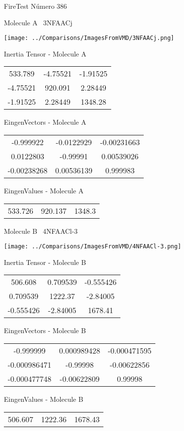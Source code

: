 \vtab[-3cm]
\begin{center}
{\large FireTest \tab Número 386}
\end{center}
\begin{multicols}{2}
\begin{center}

Molecule A \
3NFAACj

\texttt{[image: ../Comparisons/ImagesFromVMD/3NFAACj.png]}

Inertia Tensor - Molecule A \\
\begin{tabular}{|c c c|}
533.789	 & 	-4.75521	 & 	-1.91525	 \\
-4.75521	 & 	920.091	 & 	2.28449	 \\
-1.91525	 & 	2.28449	 & 	1348.28
\end{tabular}

\vtab
 EingenVectors - Molecule A     \\
\begin{tabular}{|c c c|}
-0.999922	 & 	-0.0122929	 & 	-0.00231663	 \\
0.0122803	 & 	-0.99991	 & 	0.00539026	 \\
-0.00238268	 & 	0.00536139	 & 	0.999983
\end{tabular}

\vtab
 EingenValues - Molecule A     \\
\begin{tabular}{|c c c|}
533.726	 & 	920.137	 & 	1348.3	 \\
\end{tabular}
\columnbreak

Molecule B \
4NFAACl-3

\texttt{[image: ../Comparisons/ImagesFromVMD/4NFAACl-3.png]}

Inertia Tensor - Molecule B \\
\begin{tabular}{|c c c|}
506.608	 & 	0.709539	 & 	-0.555426	 \\
0.709539	 & 	1222.37	 & 	-2.84005	 \\
-0.555426	 & 	-2.84005	 & 	1678.41
\end{tabular}

\vtab
 EingenVectors - Molecule B     \\
\begin{tabular}{|c c c|}
-0.999999	 & 	0.000989428	 & 	-0.000471595	 \\
-0.000986471	 & 	-0.99998	 & 	-0.00622856	 \\
-0.000477748	 & 	-0.00622809	 & 	0.99998
\end{tabular}

\vtab
 EingenValues - Molecule B     \\
\begin{tabular}{|c c c|}
506.607	 & 	1222.36	 & 	1678.43	 \\
\end{tabular}

\end{center}
\end{multicols}

